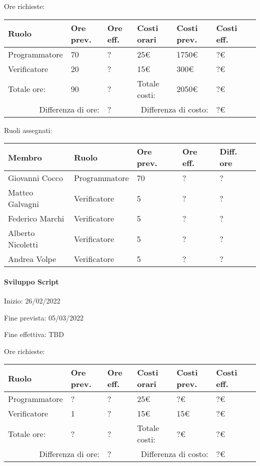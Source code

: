 \documentclass[a4paper, 12pt]{article}
\begin{document}
Ore richieste:\\[0.5em]
\begin{tabular}{|l|l|l||l|l|l|l|}\hline
Ruolo & Ore prev. & Ore eff. & Costi orari & Costi prev. & Costi eff.\\\hline
Programmatore & 70 & ? & 25\euro & 1750\euro & ?\euro \\\hline
Verificatore & 20 & ? & 15\euro & 300\euro & ?\euro \\\hline
Totale ore: & 90 & ? & Totale costi: & 2050\euro & ?\euro \\\hline
\multicolumn{2}{|r|}{Differenza di ore:} & ? & \multicolumn{2}{r|}{Differenza di costo:} & ?\euro \\\hline
\end{tabular}

Ruoli assegnati:\\[0.5em]
\begin{tabular}{|l|l|l|l|l|}\hline
Membro & Ruolo & Ore prev. & Ore eff. & Diff. ore \\\hline
Giovanni Cocco & Programmatore & 70 & ? & ? \\\hline
Matteo Galvagni & Verificatore & 5 & ? & ? \\\hline
Federico Marchi & Verificatore & 5 & ? & ? \\\hline
Alberto Nicoletti & Verificatore & 5 & ? & ? \\\hline
Andrea Volpe & Verificatore & 5 & ? & ? \\\hline
\end{tabular}

\paragraph{Sviluppo Script}
Inizio: 26/02/2022\par
Fine prevista: 05/03/2022\par
Fine effettiva: TBD

Ore richieste:\\[0.5em]
\begin{tabular}{|l|l|l||l|l|l|l|}\hline
Ruolo & Ore prev. & Ore eff. & Costi orari & Costi prev. & Costi eff.\\\hline
Programmatore & ? & ? & 25\euro & ?\euro & ?\euro \\\hline
Verificatore & 1 & ? & 15\euro & 15\euro & ?\euro \\\hline
Totale ore: & ? & ? & Totale costi: & ?\euro & ?\euro \\\hline
\multicolumn{2}{|r|}{Differenza di ore:} & ? & \multicolumn{2}{r|}{Differenza di costo:} & ?\euro \\\hline
\end{tabular}
\end{document}
